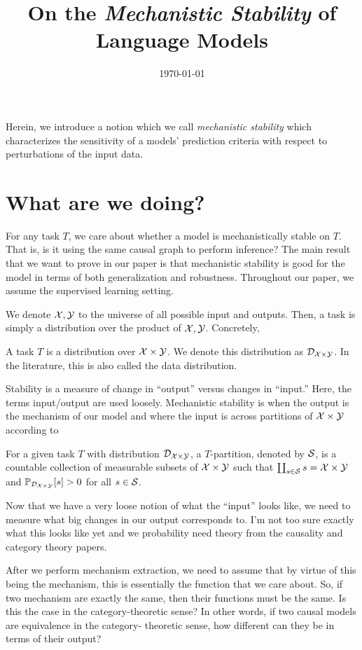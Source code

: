 \documentclass[10pt]{article}
\title{On the \textit{Mechanistic Stability} of Language Models}
\date{\today}
\begin{document}
\ifthenelse{\isundefined{\showlinenum}}{
}{
\linenumbers
}
\maketitle


Herein, we introduce a notion which we call \textit{mechanistic stability} which
characterizes the sensitivity of a models' prediction criteria with respect to
perturbations of the input data. 

\section{What are we doing?}
For any task $T$, we care about whether a model is mechanistically stable on $T$.
That is, is it using the same causal graph to perform inference? The main result
that we want to prove in our paper is that mechanistic stability is good for
the model in terms of both generalization and robustness. Throughout our paper,
we assume the supervised learning setting. 

We denote $\mathcal{X}, \mathcal{Y}$ to the universe of all possible input and outputs. Then, 
a task is simply a distribution over the product of $\mathcal{X},\mathcal{Y}$. Concretely,

\begin{defn}[Task]
A task $T$ is a distribution over $\mathcal{X} \times \mathcal{Y}$. We denote this
distribution as $\mathcal{D}_{\mathcal{X}\times\mathcal{Y}}$. In the literature, this is also
called the data distribution. 
\end{defn}
Stability is a measure of change in ``output'' versus changes in ``input.'' Here,
the terms input/output are used loosely. Mechanistic stability is when the output
is the mechanism of our model and where the input is across partitions of 
$\mathcal{X} \times \mathcal{Y}$ according to 
\begin{defn}
For a given task $T$ with distribution $\mathcal{D}_{\mathcal{X}\times\mathcal{Y}}$, a $T$-partition,
denoted by $\mathcal{S}$, is a countable collection of measurable subsets of 
$\mathcal{X}\times \mathcal{Y}$ such that $\coprod_{s\in \mathcal{S}} s = \mathcal{X} \times \mathcal{Y}$ 
and $\mathbb{P}_{\mathcal{D}_{\mathcal{X}\times\mathcal{Y}}}[s] > 0$ for all $s \in \mathcal{S}$. 
\end{defn}
Now that we have a very loose notion of what the ``input'' looks like, we
need to measure what big changes in our output corresponds to. I'm not too
sure exactly what this looks like yet and we probability need theory from
the causality and category theory papers.

After we perform mechanism extraction, we need to assume that by virtue
of this being the mechanism, this is essentially the function that we
care about. So, if two mechanism are exactly the same, then their 
functions must be the same. Is this the case in the category-theoretic
sense? In other words, if two causal models are equivalence in the category-
theoretic sense, how different can they be in terms of their output?
\end{document}
